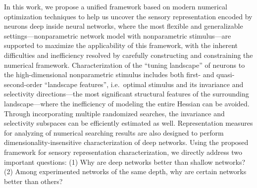 In this work, we propose a unified framework based on modern numerical optimization techniques to help us uncover the sensory representation encoded by neurons deep inside neural networks, where the most flexible and generalizable settings---nonparametric network model with nonparametric stimulus---are supported to maximize the applicability of this framework, with the inherent difficulties and inefficiency resolved by carefully constructing and constraining the numerical framework. Characterization of the ``tuning landscape'' of neurons to the high-dimensional nonparametric stimulus includes both first- and quasi-second-order ``landscape features'', i.e.~optimal stimulus and its invariance and selectivity directions---the most significant structural features of the surrounding landscape---where the inefficiency of modeling the entire Hessian can be avoided. Through incorporating multiple randomized searches, the invariance and selectivity subspaces can be efficiently estimated as well. Representation measures for analyzing of numerical searching results are also designed to perform dimensionality-insensitive characterization of deep networks. Using the proposed framework for sensory representation characterization, we directly address two important questions: (1) Why are deep networks better than shallow networks? (2) Among experimented networks of the same depth, why are certain networks better than others? %

